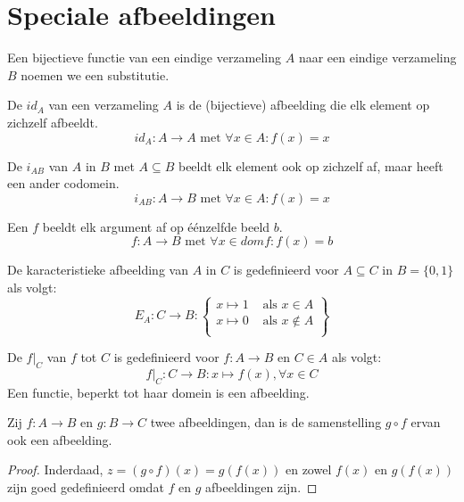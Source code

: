 \documentclass[main.tex]{subfiles}
\begin{document}
\section{Speciale afbeeldingen}
\label{sec:spec-afbe}

\begin{de}
  Een bijectieve functie van een eindige verzameling $A$ naar een eindige verzameling $B$ noemen we een substitutie. 
\end{de}

\begin{de}
  \label{identieke-transformatie}
  De  $id_{A}$ van een verzameling $A$ is de (bijectieve) afbeelding die elk element op zichzelf afbeeldt.
  \[ id_{A}: A \rightarrow A \text{ met } \forall x \in A: f(x) = x \]
\end{de}

\begin{de}
  De  $i_{AB}$ van $A$ in $B$ met $A \subseteq B$ beeldt elk element ook op zichzelf af, maar heeft een ander codomein.
  \[ i_{AB}: A \rightarrow B \text{ met } \forall x \in A: f(x) = x \]
\end{de}

\begin{de}
  Een  $f$ beeldt elk argument af op \'e\'enzelfde beeld $b$.
  \[ f: A \rightarrow B \text{ met } \forall x \in dom f: f(x) = b \]
\end{de}

\begin{de}
  De karacteristieke afbeelding van $A$ in $C$ is gedefinieerd voor $A \subseteq C$ in $B = \{0,1\}$ als volgt:
  \[
  E_{A}: C \rightarrow B:
  \left \lbrace
    \begin{array}{cc}
      x \mapsto 1 &\text{ als } x \in A\\
      x \mapsto 0 &\text{ als } x \not\in A\\
    \end{array}
  \right \rbrace
  \]
\end{de}

\begin{de}
  De  $f|_{C}$ van $f$ tot $C$ is gedefinieerd voor $f: A \rightarrow B$ en $C \in A$ als volgt:
  \[ f|_{C}: C \rightarrow B: x \mapsto f(x), \forall x \in C\]
  Een functie, beperkt tot haar domein is een afbeelding.
\end{de}

\begin{st}
  Zij $f: A \rightarrow B$ en $g: B \rightarrow C$ twee afbeeldingen, dan is de samenstelling $g \circ f$ ervan ook een afbeelding.

  \begin{proof}
    Inderdaad, $z = (g \circ f)(x) = g(f(x))$ en zowel $f(x)$ en $g(f(x))$ zijn goed gedefinieerd omdat $f$ en $g$ afbeeldingen zijn. 
  \end{proof}
\end{st}
\end{document}
